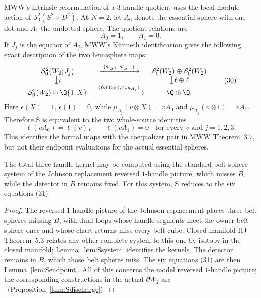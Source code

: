 MWW's intrinsic reformulation of a $3$-handle quotient uses the local module
action of $\mathcal S^2_0(S^2\times D^2)$.  At $N=2$, let $A_0$ denote the
essential sphere with one dot and $A_1$ the undotted sphere.  The quotient
relations are
\[
A_0=1,\qquad A_1=0.
\]
If $J_j$ is the equator of $A_j$, MWW's K\"unneth identification gives the
following exact description of the two hemisphere maps:
\[
\begin{array}{ccc}
\mathcal S^2_0(W_2;J_j)&\xrightarrow{\ (\Psi_{\Delta^+},\Psi_{\Delta^-})\ }&
\mathcal S^2_0(W_2)\oplus\mathcal S^2_0(W_2)\\
\big\downarrow\wr&&\big\downarrow{\ell\oplus\ell}\\
\mathcal S^2_0(W_2)\otimes\Q\{1,X\}
&\xrightarrow{\ (\ell\circ(1\otimes\epsilon),\,\ell\circ\mu_{A_j})\ }&
\Q\oplus\Q.
\end{array}
\tag{30}
\]
Here $\epsilon(X)=1$, $\epsilon(1)=0$, while
$\mu_{A_j}(v\otimes X)=vA_0$ and
$\mu_{A_j}(v\otimes1)=vA_1$.  Therefore S is equivalent to the two
whole-source identities
\[
\ell(vA_0)=\ell(v),\qquad \ell(vA_1)=0
\quad\text{for every }v\text{ and }j=1,2,3.
\tag{31}
\]
This identifies the formal maps with the coequalizer pair in MWW
Theorem~3.7, but not their endpoint evaluations for the actual essential
spheres.

\begin{proposition}\label{thm:Sgeometry}
The total three-handle kernel may be computed using the standard belt-sphere
system of the Johnson replacement reversed $1$-handle picture, which misses
$B$, while the detector in $B$ remains fixed.  For this system, S reduces to
the six equations (31).
\end{proposition}

\begin{proof}
The reversed $1$-handle picture of the Johnson replacement places three
belt spheres missing $B$, with dual loops whose handle segments meet the
owner belt sphere once and whose chart returns miss every belt cube.
Closed-manifold HJ Theorem~5.3 relates any other complete
system to this one by isotopy in the closed manifold; Lemma~\ref{lem:Ssystem}
identifies the kernels.  The detector remains in $B$, which those belt
spheres miss.  The six equations (31) are then Lemma~\ref{lem:Sendpoint}.
All of this concerns the model reversed $1$-handle picture; the
corresponding constructions in the actual $\partial W_2$ are \Open\
(Proposition~\ref{thm:Sdischarge}).
\end{proof}

